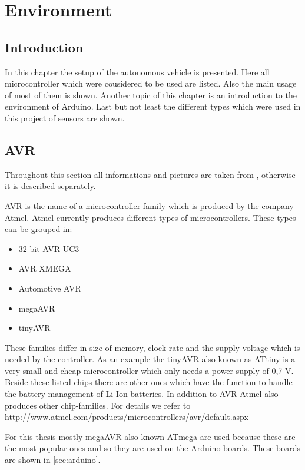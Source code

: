 \chapter{Environment} \label{chap:environment}
\section{Introduction} \label{sec:introduction}
In this chapter the setup of the autonomous vehicle is presented. 
Here all microcontroller which were cousidered to be used are listed.
Also the main usage of most of them is shown.
Another topic of this chapter is an introduction to the environment of Arduino.
Last but not least the different types which were used in this project of sensors are shown.

\section{AVR} \label{sec:AVR}
Throughout this section all informations and pictures are taken from \cite{web:Atmel}, otherwise it is described separately.

AVR is the name of a microcontroller-family which is produced by the company Atmel.
Atmel currently produces different types of microcontrollers.
These types can be grouped in:

\begin{itemize}
\item 32-bit AVR UC3
\item AVR XMEGA
\item Automotive AVR
\item megaAVR
\item tinyAVR
\end{itemize}

These families differ in size of memory, clock rate and the supply voltage which is needed by the controller.
As an example the tinyAVR also known as ATtiny is a very small and cheap microcontroller which only needs a power supply of 0,7 V.
Beside these listed chips there are other ones which have the function to handle the battery management of Li-Ion batteries.
In addition to AVR Atmel also produces other chip-families.
For details we refer to \url{ http://www.atmel.com/products/microcontrollers/avr/default.aspx }

For this thesis mostly megaAVR also known ATmega are used because these are the most popular ones and so they are used on the Arduino boards.
These boards are shown in \ref{sec:arduino}.

